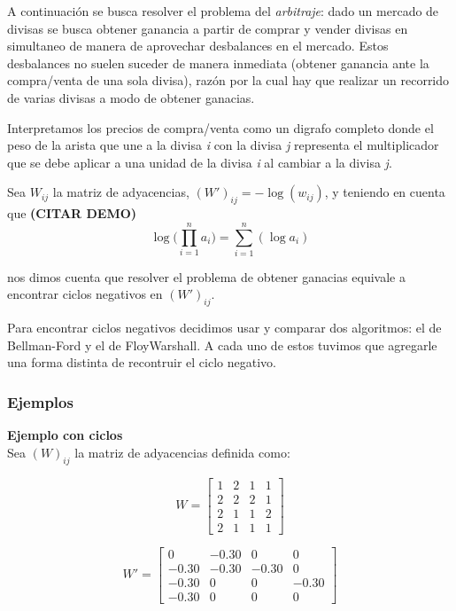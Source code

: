 \par A continuaci\'on se busca resolver el problema del \textit{arbitraje}: dado un mercado de divisas se busca
obtener ganancia a partir de comprar y vender divisas en simultaneo de manera de aprovechar desbalances 
en el mercado. Estos desbalances no suelen suceder de manera inmediata (obtener ganancia ante la compra/venta
de una sola divisa), raz\'on por la cual hay que realizar un recorrido de varias divisas a modo de obtener ganacias.
\par Interpretamos los precios de compra/venta como un digrafo completo donde el peso
de la arista que une a la divisa \textit{i} con la divisa \textit{j} representa el multiplicador 
que se debe aplicar a una unidad de la divisa \textit{i} al cambiar a la divisa \textit{j}.
\par Sea $W_{ij}$ la matriz de adyacencias, $(W')_{ij} = - \log (w_{ij})$, y teniendo en 
cuenta que \textbf{(CITAR DEMO)}
\begin{equation}
    \log{ (\prod_{i=1}^n a_i}) = \sum_{i=1}^n (\log{ a_i})
\end{equation}
\par nos dimos cuenta que resolver el problema de obtener ganacias equivale a encontrar ciclos negativos en
$(W')_{ij}$.
\par Para encontrar ciclos negativos decidimos usar y comparar dos algoritmos: el de Bellman-Ford y el de
FloyWarshall. A cada uno de estos tuvimos que agregarle una forma distinta de recontruir el ciclo negativo.

\subsubsection{Ejemplos}

\textbf{Ejemplo con ciclos}\\
Sea $(W)_{ij}$ la matriz de adyacencias definida como:
    
\begin{figure}[H] 
    \centering
    \begin{minipage}{0.35\textwidth}
        \centering
\[
W=
  \begin{bmatrix}
    1 & 2 & 1 & 1\\
    2 & 2 & 2 & 1\\
    2 & 1 & 1 & 2\\
    2 & 1 & 1 & 1
  \end{bmatrix}
\]
    \end{minipage}
    \begin{minipage}{0.45\textwidth}
        \centering
\[
W'=
  \begin{bmatrix}
    0 & -0.30 & 0 & 0\\
    -0.30 & -0.30 & -0.30 & 0\\
    -0.30 & 0 & 0 & -0.30\\
    -0.30 & 0 & 0 & 0
  \end{bmatrix}
\]
    \end{minipage}\hfill
\end{figure}


